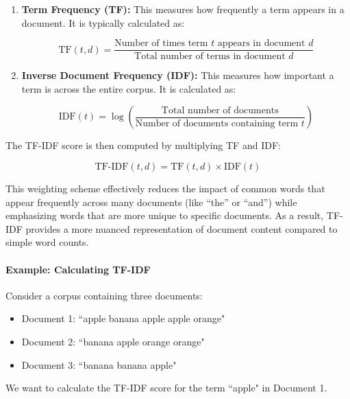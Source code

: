 \begin{enumerate}
    \item \textbf{Term Frequency (TF):} This measures how frequently a term appears in a document. It is typically calculated as:
    
    \begin{equation}
        \text{TF}(t,d) = \frac{\text{Number of times term } t \text{ appears in document } d}{\text{Total number of terms in document } d}
    \end{equation}

    \item \textbf{Inverse Document Frequency (IDF):} This measures how important a term is across the entire corpus. It is calculated as:
    
    \begin{equation}
        \text{IDF}(t) = \log\left(\frac{\text{Total number of documents}}{\text{Number of documents containing term } t}\right)
    \end{equation}
\end{enumerate}

The TF-IDF score is then computed by multiplying TF and IDF:

\begin{equation}
    \text{TF-IDF}(t,d) = \text{TF}(t,d) \times \text{IDF}(t)
\end{equation}

This weighting scheme effectively reduces the impact of common words that appear frequently across many documents (like ``the'' or ``and'') while emphasizing words that are more unique to specific documents. As a result, TF-IDF provides a more nuanced representation of document content compared to simple word counts.

\paragraph{Example: Calculating TF-IDF}

Consider a corpus containing three documents:
\begin{itemize}
    \item Document 1: ``apple banana apple apple orange"
    \item Document 2: ``banana apple orange orange"
    \item Document 3: ``banana banana apple"
\end{itemize}

We want to calculate the TF-IDF score for the term ``apple" in Document 1.

